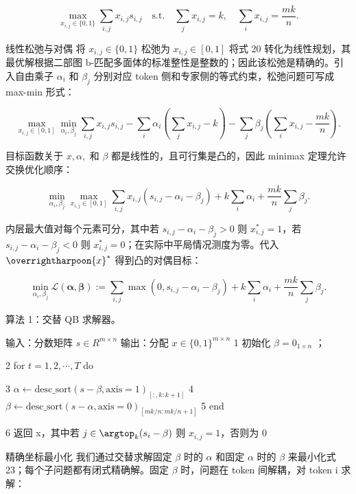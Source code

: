 \[
\max _ {x _ {i, j} \in \{0, 1 \}} \sum_ {i, j} x _ {i, j} s _ {i, j} \quad \text {s.t.} \quad \sum_ {j} x _ {i, j} = k, \quad \sum_ {i} x _ {i, j} = \frac {m k}{n}.\tag{20}
\]

线性松弛与对偶 将 \(x _ { i , j } \in \{ 0 , 1 \}\) 松弛为 \(x _ { i , j } \in [ 0 , 1 ]\) 将式 20 转化为线性规划，其最优解根据二部图 b-匹配多面体的标准整性是整数的；因此该松弛是精确的。引入自由乘子 \(\alpha _ { i }\) 和 \(\beta _ { j }\) 分别对应 token 侧和专家侧的等式约束，松弛问题可写成 max-min 形式：

\[
\max _ {x _ {i, j} \in [ 0, 1 ]} \min _ {\alpha_ {i}, \beta_ {j}} \sum_ {i, j} x _ {i, j} s _ {i, j} - \sum_ {i} \alpha_ {i} \left(\sum_ {j} x _ {i, j} - k\right) - \sum_ {j} \beta_ {j} \left(\sum_ {i} x _ {i, j} - \frac {m k}{n}\right).\tag{21}
\]

目标函数关于 \({ \mathbf { } } x , \alpha ,\) 和 \(\beta\) 都是线性的，且可行集是凸的，因此 minimax 定理允许交换优化顺序：

\[
\min _ {\alpha_ {i}, \beta_ {j}} \max _ {x _ {i, j} \in [ 0, 1 ]} \sum_ {i, j} x _ {i, j} \left(s _ {i, j} - \alpha_ {i} - \beta_ {j}\right) + k \sum_ {i} \alpha_ {i} + \frac {m k}{n} \sum_ {j} \beta_ {j}.\tag{22}
\]

内层最大值对每个元素可分，其中若 \(s _ { i , j } - \alpha _ { i } - \beta _ { j } > 0\) 则 \(x _ { i , j } ^ { * } = 1\)，若 \(s _ { i , j } - \alpha _ { i } - \beta _ { j } < 0\) 则 \(x _ { i , j } ^ { * } = 0\)；在实际中平局情况测度为零。代入 \(\overrightharpoon { x } ^ { * }\) 得到凸的对偶目标：

\[
\min _ {\alpha_ {i}, \beta_ {j}} \mathcal {L} (\boldsymbol {\alpha}, \boldsymbol {\beta}) := \sum_ {i, j} \max \left(0, s _ {i, j} - \alpha_ {i} - \beta_ {j}\right) + k \sum_ {i} \alpha_ {i} + \frac {m k}{n} \sum_ {j} \beta_ {j}.\tag{23}
\]

算法 1：交替 QB 求解器。

输入：分数矩阵 \(s \in R^{m \times n}\) 输出：分配 \(x \in \{0, 1\}^{m \times n}\) 1 初始化 \(\beta = 0_{1 \times n}\) ；

2 for \(t = 1, 2, \cdots, T\) do

3
\(\alpha \leftarrow \text{desc\_sort}(s - \beta, \text{axis}=1)_{[:, k:k+1]}\)
4
\(\beta \leftarrow \text{desc\_sort}(s - \alpha, \text{axis}=0)_{[mk/n:mk/n+1]}\)
5 end

6 返回 x，其中若 \(j \in \argtop_k(s_i - \beta)\) 则 \(x_{i,j} = 1\)，否则为 0

精确坐标最小化 我们通过交替求解固定 \(\beta\) 时的 \(\alpha\) 和固定 \(\alpha\) 时的 \(\beta\) 来最小化式 23；每个子问题都有闭式精确解。固定 \(\beta\) 时，问题在 token 间解耦，对 token i 求解：

